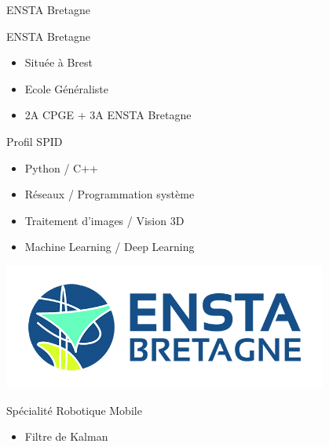 \begin{frame}{ENSTA Bretagne}{}
    \begin{minipage}{0.45\textwidth}
        \centering
        \begin{block}{ENSTA Bretagne}
            \begin{itemize}
                \item Située à Brest \\
                \item Ecole Généraliste \\
                \item 2A CPGE + 3A ENSTA Bretagne \\
            \end{itemize}
        \end{block}
        \begin{block}{Profil SPID}
            \begin{itemize}
                \item Python / C++ \\
                \item Réseaux / Programmation système\\
                \item Traitement d'images / Vision 3D \\
                \item Machine Learning / Deep Learning
            \end{itemize}
        \end{block}
    \end{minipage}
    \hfill
    \begin{minipage}{0.45\textwidth}
        \centering
        \vspace{0.3cm}
        \includegraphics[width=0.8\textwidth]{images/logo_ensta.jpg}
        \begin{block}{Spécialité Robotique Mobile}
            \begin{itemize}
                \item Filtre de Kalman \\

\end{itemize}
\end{block}
\end{minipage}
\end{frame}
